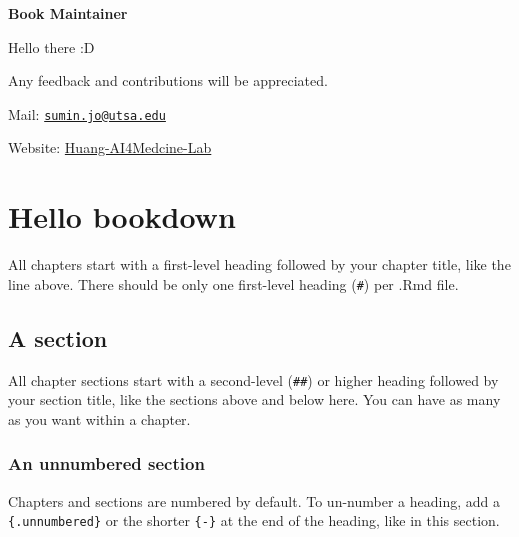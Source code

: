 \documentclass[
]{book}
\begin{document}
\textbf{Book Maintainer}

Hello there :D

Any feedback and contributions will be appreciated.

Mail: \href{mailto:sumin.jo@utsa.edu}{\nolinkurl{sumin.jo@utsa.edu}}

Website: \href{https://github.com/Huang-AI4Medcine-Lab}{Huang-AI4Medcine-Lab}

\hypertarget{hello-bookdown}{%
\chapter{Hello bookdown}\label{hello-bookdown}}

All chapters start with a first-level heading followed by your chapter title, like the line above. There should be only one first-level heading (\texttt{\#}) per .Rmd file.

\hypertarget{a-section}{%
\section{A section}\label{a-section}}

All chapter sections start with a second-level (\texttt{\#\#}) or higher heading followed by your section title, like the sections above and below here. You can have as many as you want within a chapter.

\hypertarget{an-unnumbered-section}{%
\subsection*{An unnumbered section}\label{an-unnumbered-section}}

Chapters and sections are numbered by default. To un-number a heading, add a \texttt{\{.unnumbered\}} or the shorter \texttt{\{-\}} at the end of the heading, like in this section.

  
\end{document}
